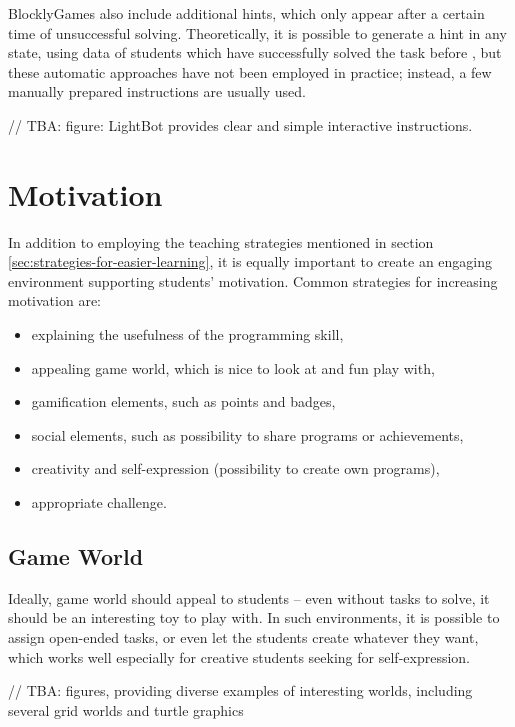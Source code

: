 BlocklyGames also include additional hints,
  which only appear after a certain time of unsuccessful solving.
Theoretically, it is possible to generate a hint in any state,
  using data of students which have successfully solved the task before
  \cite{generating-hints},
  but these automatic approaches have not been employed in practice;
  instead, a few manually prepared instructions are usually used.

// TBA: figure: LightBot provides clear and simple interactive instructions.

\section{Motivation}
\label{sec:motivation}

In addition to employing the teaching strategies mentioned in section \ref{sec:strategies-for-easier-learning},
  it is equally important to create an engaging environment supporting students’ motivation. Common strategies for increasing motivation are:

\begin{itemize}
\item explaining the usefulness of the programming skill,
\item appealing game world, which is nice to look at and fun play with,
\item gamification elements, such as points and badges,
\item social elements, such as possibility to share programs or achievements,
\item creativity and self-expression (possibility to create own programs),
\item appropriate challenge.
\end{itemize}


\subsection{Game World}
\label{sec:motivation.game-world}
Ideally, game world should appeal to students --
even without tasks to solve,
  it should be an interesting toy to play with.
In such environments, it is possible to assign open-ended tasks,
  or even let the students create whatever they want,
  which works well especially for creative students seeking for self-expression.

// TBA: figures, providing diverse examples of interesting worlds, including several grid worlds and turtle graphics



